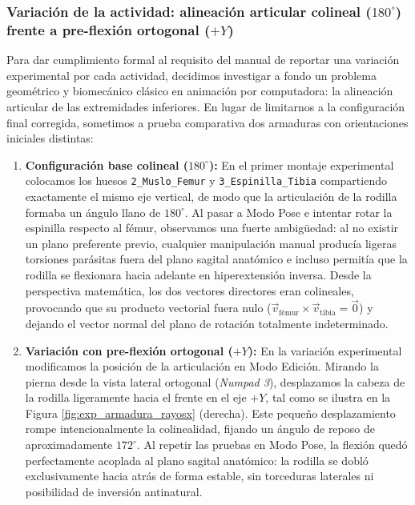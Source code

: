 \subsubsection{Variación de la actividad: alineación articular colineal (\texorpdfstring{$180^\circ$}{180 grados}) frente a pre-flexión ortogonal (\texorpdfstring{$+Y$}{+Y})}

Para dar cumplimiento formal al requisito del manual de reportar una variación experimental por cada actividad, decidimos investigar a fondo un problema geométrico y biomecánico clásico en animación por computadora: la alineación articular de las extremidades inferiores. En lugar de limitarnos a la configuración final corregida, sometimos a prueba comparativa dos armaduras con orientaciones iniciales distintas:

\begin{enumerate}[noitemsep, topsep=4pt]
    \item \textbf{Configuración base colineal ($180^\circ$):} En el primer montaje experimental colocamos los huesos \texttt{2\_Muslo\_Femur} y \texttt{3\_Espinilla\_Tibia} compartiendo exactamente el mismo eje vertical, de modo que la articulación de la rodilla formaba un ángulo llano de $180^\circ$. Al pasar a Modo Pose e intentar rotar la espinilla respecto al fémur, observamos una fuerte ambigüedad: al no existir un plano preferente previo, cualquier manipulación manual producía ligeras torsiones parásitas fuera del plano sagital anatómico e incluso permitía que la rodilla se flexionara hacia adelante en hiperextensión inversa. Desde la perspectiva matemática, los dos vectores directores eran colineales, provocando que su producto vectorial fuera nulo ($\vec{v}_{\text{fémur}} \times \vec{v}_{\text{tibia}} = \vec{0}$) y dejando el vector normal del plano de rotación totalmente indeterminado.
    \item \textbf{Variación con pre-flexión ortogonal ($+Y$):} En la variación experimental modificamos la posición de la articulación en Modo Edición. Mirando la pierna desde la vista lateral ortogonal (\textit{Numpad 3}), desplazamos la cabeza de la rodilla ligeramente hacia el frente en el eje $+Y$, tal como se ilustra en la Figura \ref{fig:exp_armadura_rayosx} (derecha). Este pequeño desplazamiento rompe intencionalmente la colinealidad, fijando un ángulo de reposo de aproximadamente $172^\circ$. Al repetir las pruebas en Modo Pose, la flexión quedó perfectamente acoplada al plano sagital anatómico: la rodilla se dobló exclusivamente hacia atrás de forma estable, sin torceduras laterales ni posibilidad de inversión antinatural.
\end{enumerate}

